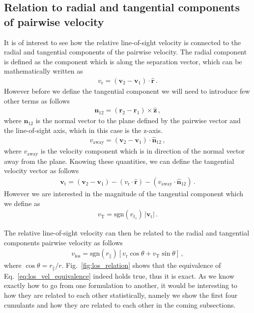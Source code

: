 \documentclass[a4paper,fleqn,usenatbib]{mnras}
\begin{document}
	\subsection{Relation to radial and tangential components of pairwise velocity}
	
	It is of interest to see how the relative line-of-sight velocity is connected to the radial and tangential components of the pairwise velocity. The radial component is defined as the component which is along the separation vector, which can be mathematically written as
	\begin{eqnarray}	
	v_{\mathrm{r}} = \left(\mathbf{v}_2 - \mathbf{v}_1\right)\cdot \hat{\mathbf{r}} \, .
	\end{eqnarray}
	However before we define the tangential component we will need to introduce few other terms as follows
	\begin{eqnarray}
		\mathbf{n}_{12} = \left(\mathbf{r}_2 - \mathbf{r}_1\right) \times \hat{\mathbf{z}} \, ,
	\end{eqnarray}	
	\noindent where $\mathbf{n}_{12}$ is the normal vector to the plane defined by the pairwise vector and the line-of-sight axis, which in this case is the z-axis. 
	\begin{eqnarray}
	v_{\mathrm{away}} = \left(\mathbf{v}_2 - \mathbf{v}_1\right) \cdot \hat{\mathbf{n}}_{12} \, ,
	\end{eqnarray}	
	\noindent where $v_{\mathrm{away}}$ is the velocity component which is in direction of the normal vector away from the plane. Knowing these quantities, we can define the tangential velocity vector as follows
	\begin{eqnarray}
	\mathbf{v}_{\mathrm{t}} = \left(\mathbf{v}_2 - \mathbf{v}_1\right) - (v_{\mathrm{r}}\cdot \hat{\mathbf{r}}) - (v_{\mathrm{away}} \cdot \hat{\mathbf{n}}_{12}) \, .		
	\end{eqnarray}
	\noindent However we are interested in the magnitude of the tangential component which we define as
	\begin{eqnarray}
		v_{\mathrm{T}} = \mathrm{sgn}(v_{t_z})\, \lvert \mathbf{v}_{\mathrm{t}} \rvert \, .
	\end{eqnarray}
	
	 The relative line-of-sight velocity can then be related to the radial and tangential components pairwise velocity as follows
	\begin{eqnarray} \label{eq:los_vel_equivalence}
	v_{\mathrm{los}} = \mathrm{sgn}(r_{\parallel}) \left[v_{\mathrm{r}} \cos\theta + v_{\mathrm{T}}\sin\theta\right] \, ,
	\end{eqnarray}
	\noindent where $\cos\theta = r_{\parallel}/r$. Fig.~\ref{fig:los_relation} shows that the equivalence of Eq.~\ref{eq:los_vel_equivalence} indeed holds true, thus it is exact. As we know exactly how to go from one formulation to another, it would be interesting to how they are related to each other statistically, namely we show the first four cumulants and how they are related to each other in the coming subsections.
\end{document}
